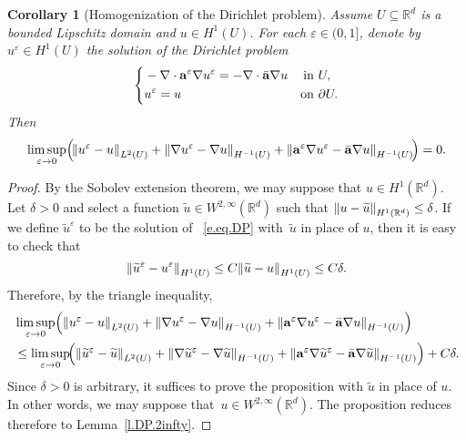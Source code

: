 \documentclass[11pt]{article} %
\numberwithin{equation}{section}
\newtheorem{corollary}[theorem]{Corollary}
\theoremstyle{definition}
\let\originalleft\left
\let\originalright\right
\renewcommand{\left}{\mathopen{}\mathclose\bgroup\originalleft}
\renewcommand{\right}{\aftergroup\egroup\originalright}
\newcommand*{\Rd}{\ensuremath{\mathbb{R}^d}}
\newcommand{\eps}{\varepsilon}
\renewcommand*{\tilde}{\widetilde}
\newcommand{\ep}{\eps}
\renewcommand{\a}{\mathbf{a}}
\newcommand{\ahom}{\bar{\a}}
\begin{document}
\begin{corollary}[Homogenization of the Dirichlet problem]
\label{c.DP}
Assume $U\subseteq\Rd$ is a bounded Lipschitz domain and $u\in H^1(U)$. For each $\ep\in (0,1]$, denote by~$u^\ep \in H^1(U)$ the solution of the Dirichlet problem 
\begin{align}
\label{e.eq.DP}
\left\{
\begin{aligned}
& -\nabla \cdot \a^\ep \nabla u^\ep = - \nabla \cdot \ahom\nabla u & \mbox{in} & \ U, 
\\
& u^\ep = u & \mbox{on} & \ \partial U. 
\end{aligned}
\right.
\end{align}
Then
\begin{equation}
\label{e.Dp.homog}
\limsup_{\ep\to 0} 
\Bigl( \!
\left\| u^\ep - u \right\|_{L^2(U)}
+ 
\left\| \nabla u^\ep - \nabla u \right\|_{H^{-1}(U)} 
+
\left\| \a^\ep \nabla u^\ep - \ahom \nabla u \right\|_{H^{-1}(U)} 
\! \Bigr)
= 0.
\end{equation}
\end{corollary}
\begin{proof}
By the Sobolev extension theorem, we may suppose that $u\in H^1(\Rd)$. Let $\delta>0$ and select a function $\tilde{u} \in W^{2,\infty}(\Rd)$ such that 
$\left\| u - \tilde{u} \right\|_{H^1(\Rd)} \leq \delta$. If we define $\tilde{u}^\ep$ to be the solution of ~\eqref{e.eq.DP} with~$\tilde{u}$ in place of $u$, then it is easy to check that
\begin{equation}
\left\| \tilde{u}^\ep - u^\ep \right\|_{H^1(U)} 
\leq 
C\left\| \tilde{u} - u \right\|_{H^1(U)} 
\leq C\delta. 
\end{equation}
Therefore, by the triangle inequality, 
\begin{align*}
& \limsup_{\ep\to 0} 
\left( 
\left\| u^\ep - u \right\|_{L^2(U)}
+ 
\left\| \nabla u^\ep - \nabla u \right\|_{H^{-1}(U)} 
+
\left\| \a^\ep \nabla u^\ep - \ahom \nabla u \right\|_{H^{-1}(U)} 
\right)
\\ & 
\leq
\limsup_{\ep\to 0} \!
\left( 
\left\|  \tilde{u}^\ep -  \tilde{u} \right\|_{L^2(U)}
+ 
\left\| \nabla  \tilde{u}^\ep - \nabla  \tilde{u} \right\|_{H^{-1}(U)} 
+
\left\| \a^\ep \nabla  \tilde{u}^\ep - \ahom \nabla  \tilde{u} \right\|_{H^{-1}(U)} 
\right)
+ C\delta. 
\end{align*}
Since $\delta>0$ is arbitrary, it suffices to prove the proposition with $\tilde{u}$ in place of $u$. In other words, we may suppose that~$u \in W^{2,\infty}(\Rd)$. The proposition reduces therefore to Lemma~\ref{l.DP.2infty}. 
\end{proof}
\end{document}
